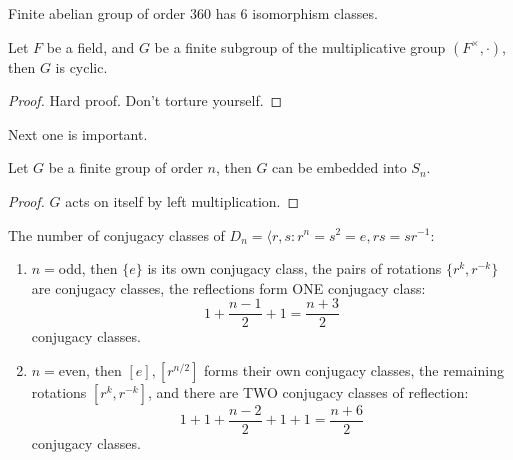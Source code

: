 \documentclass[openany]{book}
\newcommand{\la}{\langle}
\begin{document}
\begin{example}
    Finite abelian group of order $360$ has $6$ isomorphism classes.
\end{example}


\begin{thm}
    Let $F$ be a field, and $G$ be a finite subgroup of the multiplicative group $(F^\times, \cdot)$, then $G$ is cyclic.
\end{thm}
\begin{proof}
    Hard proof. Don't torture yourself.
\end{proof}


\begin{warn}
    Next one is important.
\end{warn}


\begin{prop}
    Let $G$ be a finite group of order $n$, then $G$ can be embedded into $S_n$.
\end{prop}
\begin{proof}
    $G$ acts on itself by left multiplication.
\end{proof}



\begin{prop}
    The number of conjugacy classes of $D_n=\la r, s: r^n=s^2=e, rs=sr^{-1}$: 
    \begin{enumerate}
        \item $n=$odd, then $\{e\}$ is its own conjugacy class, the pairs of rotations $\{r^k, r^{-k}\}$ are conjugacy classes, the reflections form ONE conjugacy class: 
        \begin{equation*}
            1+\frac{n-1}{2}+1=\frac{n+3}{2}
        \end{equation*}
        conjugacy classes.
        \item $n=$even, then $[e], [r^{n/2}]$ forms their own conjugacy classes, the remaining rotations $[r^k, r^{-k}]$, and there are TWO conjugacy classes of reflection:
        \begin{equation*}
            1+1+\frac{n-2}{2}+1+1=\frac{n+6}{2}
        \end{equation*}
        conjugacy classes.
    \end{enumerate}
\end{prop}
\end{document}
